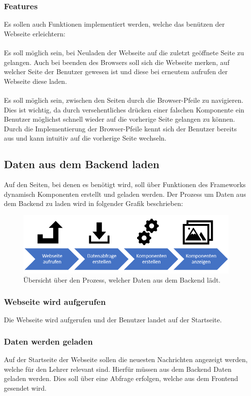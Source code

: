 \subsubsection{Features}
Es sollen auch Funktionen implementiert werden, welche das benützen der Webseite erleichtern:
\\\\
Es soll möglich sein, bei Neuladen der Webseite auf die zuletzt geöffnete Seite zu gelangen. Auch bei beenden des Browsers soll sich die Webseite merken, auf welcher Seite der Benutzer gewesen ist und diese bei erneutem aufrufen der Webseite diese laden.
\\\\
Es soll möglich sein, zwischen den Seiten durch die Browser-Pfeile zu navigieren. Dies ist wichtig, da durch versehentliches drücken einer falschen Komponente ein Benutzer möglichst schnell wieder auf die vorherige Seite gelangen zu können. Durch die Implementierung der Browser-Pfeile kennt sich der Benutzer bereits aus und kann intuitiv auf die vorherige Seite wechseln.
\newpage
\subsection{Daten aus dem Backend laden}
Auf den Seiten, bei denen es benötigt wird, soll über Funktionen des Frameworks dynamisch Komponenten erstellt und geladen werden. Der Prozess um Daten aus dem Backend zu laden wird in folgender Grafik beschrieben:
\begin{figure}[H]
	\centering
	\includegraphics[width=0.8\linewidth]{images/Prozess_Daten_laden}
	\caption[Prozess der Daten zur Anzeige]{Übersicht über den Prozess, welcher Daten aus dem Backend lädt.}
	\label{fig:prozessdatenladen}
\end{figure}

\subsubsection{Webseite wird aufgerufen}
Die Webseite wird aufgerufen und der Benutzer landet auf der Startseite.

\subsubsection{Daten werden geladen}
Auf der Startseite der Webseite sollen die neuesten Nachrichten angezeigt werden, welche für den Lehrer relevant sind. Hierfür müssen aus dem Backend Daten geladen werden. Dies soll über eine Abfrage erfolgen, welche aus dem Frontend gesendet wird.

